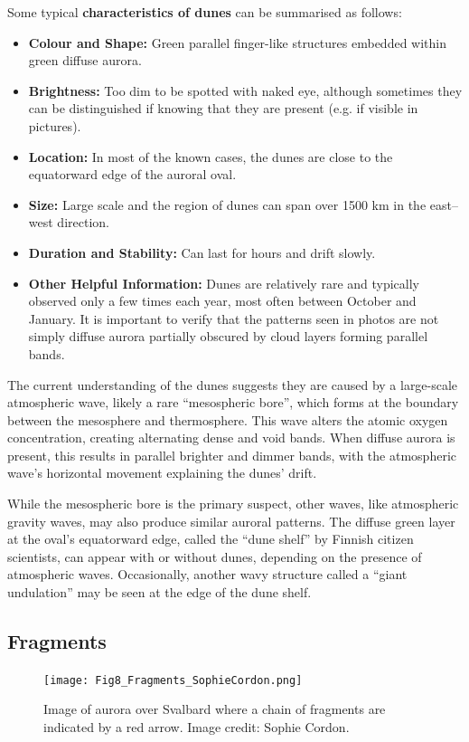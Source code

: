 \documentclass{article}
\newcommand{\contributed}[1]{%
    \par\noindent
    \begingroup
    \setlength{\leftskip}{1em}%
    \itshape
    Contributors: #1
    \par
    \endgroup
    \vspace{0.5em}
}
\begin{document}
Some typical {\bf characteristics of dunes} can be summarised as follows:
\begin{itemize}
    \item \textbf{Colour and Shape:} Green parallel finger-like structures embedded within green diffuse aurora.
    \item \textbf{Brightness:} Too dim to be spotted with naked eye, although sometimes they can be distinguished if knowing that they are present (e.g. if visible in pictures).
    \item \textbf{Location:} In most of the known cases, the dunes are close to the equatorward edge of the auroral oval.
    \item \textbf{Size:} Large scale and the region of dunes can span over 1500 km in the east--west direction.
    \item \textbf{Duration and Stability:} Can last for hours and drift slowly. 
    \item \textbf{Other Helpful Information:} Dunes are relatively rare and typically observed only a few times each year, most often between October and January. It is important to verify that the patterns seen in photos are not simply diffuse aurora partially obscured by cloud layers forming parallel bands.
    \end{itemize}

The current understanding of the dunes suggests they are caused by a large-scale atmospheric wave, likely a rare ``mesospheric bore'', which forms at the boundary between the mesosphere and thermosphere. This wave alters the atomic oxygen concentration, creating alternating dense and void bands. When diffuse aurora is present, this results in parallel brighter and dimmer bands, with the atmospheric wave’s horizontal movement explaining the dunes' drift.

While the mesospheric bore is the primary suspect, other waves, like atmospheric gravity waves, may also produce similar auroral patterns. The diffuse green layer at the oval's equatorward edge, called the ``dune shelf'' by Finnish citizen scientists, can appear with or without dunes, depending on the presence of atmospheric waves. Occasionally, another wavy structure called a ``giant undulation'' may be seen at the edge of the dune shelf.

\subsection{ Fragments}\label{fragments} 
\begin{figure}
  \texttt{[image: Fig8\_Fragments\_SophieCordon.png]}
  \caption{Image of aurora over Svalbard where a chain of fragments are indicated by a red arrow. Image credit: Sophie Cordon.}
  \label{FragmentsExample}
\end{figure}
\end{document}
